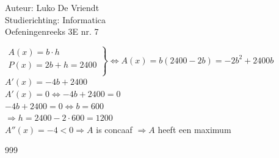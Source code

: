 \documentclass[a4paper]{article}
\begin{document}
\noindent \large Auteur: Luko De Vriendt\\
\noindent \large Studierichting: Informatica\\
\noindent \large Oefeningenreeks 3E nr. 7\\

\medskip

\normalsize

$\left .
\begin{array}{l}
A(x) = b \cdot h \\
P(x) = 2b + h = 2400 \\
\end{array}
\right \} \Leftrightarrow A(x) = b(2400 - 2b) = -2b^2 + 2400b$ \\

$A'(x) = -4b + 2400$ \\

$A'(x) = 0 \Leftrightarrow -4b + 2400 = 0$ \\

$-4b + 2400 = 0 \Leftrightarrow b = 600$ \\

$\Rightarrow h = 2400 - 2\cdot 600 = 1200$ \\

$A''(x) = -4 < 0 \Rightarrow A$ is concaaf $\Rightarrow A$ heeft een maximum

\begin{thebibliography}{999}
\end{thebibliography}
\end{document}
